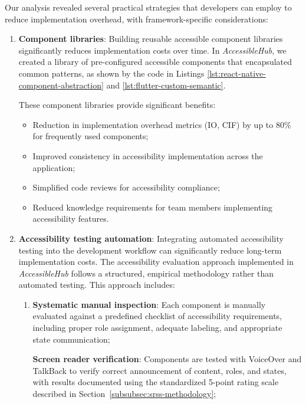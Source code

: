 Our analysis revealed several practical strategies that developers can employ to reduce implementation overhead, with framework-specific considerations:

\begin{enumerate}
    \item \textbf{Component libraries}: Building reusable accessible component libraries significantly reduces implementation costs over time. In \textit{AccessibleHub}, we created a library of pre-configured accessible components that encapsulated common patterns, as shown by the code in Listings \ref{lst:react-native-component-abstraction} and \ref{lst:flutter-custom-semantic}.

    These component libraries provide significant benefits:
    \begin{itemize}
        \item Reduction in implementation overhead metrics (IO, CIF) by up to 80\% for frequently used components;
        \item Improved consistency in accessibility implementation across the application;
        \item Simplified code reviews for accessibility compliance;
        \item Reduced knowledge requirements for team members implementing accessibility features.
    \end{itemize}
    
    \item \textbf{Accessibility testing automation}: Integrating automated accessibility testing into the development workflow can significantly reduce long-term implementation costs. The accessibility evaluation approach implemented in \textit{AccessibleHub} follows a structured, empirical methodology rather than automated testing. This approach includes:

    \begin{enumerate}
        \item \textbf{Systematic manual inspection}: Each component is manually evaluated against a predefined checklist of accessibility requirements, including proper role assignment, adequate labeling, and appropriate state communication;

        \textbf{Screen reader verification}: Components are tested with VoiceOver and TalkBack to verify correct announcement of content, roles, and states, with results documented using the standardized 5-point rating scale described in Section~\ref{subsubsec:srss-methodology};


\end{enumerate}
\end{enumerate}
